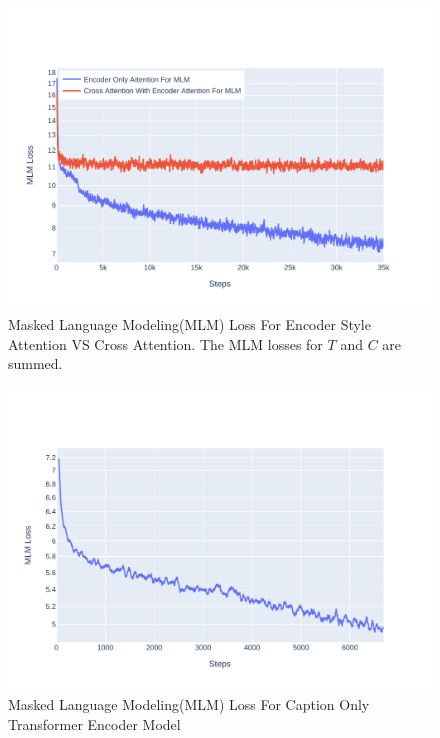 \begin{figure}[h]
    \centering
    \includegraphics[width=\maxwidth{\textwidth}]{src/images/mlm-loss-comparison.pdf}
    \caption{Masked Language Modeling(MLM) Loss For Encoder Style Attention VS Cross Attention. The MLM losses for $T$ and $C$ are summed. }
    \label{figure\arabic{figurecounter}}
\end{figure}

\begin{figure}[h]
    \centering
    \includegraphics[width=\maxwidth{\textwidth}]{src/images/mlm-loss-comparison-caption.pdf}
    \caption{Masked Language Modeling(MLM) Loss For Caption Only Transformer Encoder Model }
    \label{figure\arabic{figurecounter}}
\end{figure}

